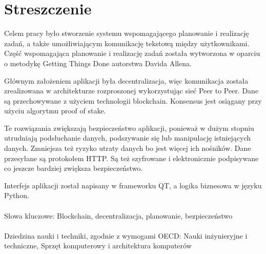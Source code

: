 \chapter*{Streszczenie}
\thispagestyle{plain}

Celem pracy było stworzenie systemu wspomagającego planowanie i realizację zadań, a także umożliwiającym komunikację tekstową między użytkownikami. Część wspomagająca planowanie i realizację zadań została wytworzona w oparciu o metodykę Getting Things Done autorstwa Davida Allena. 

Głównym założeniem aplikacji była decentralizacja, więc komunikacja została zrealizowana w architekturze rozproszonej wykorzystując sieć Peer to Peer. Dane są przechowywane z użyciem technologii blockchain. Konsensus jest osiągany przy użyciu algorytmu proof of stake.

Te rozwiązania zwiększają bezpieczeństwo aplikacji, ponieważ w dużym stopniu utrudniają podsłuchanie danych, podszywanie się lub manipulację istniejących danych. Zmniejsza też ryzyko utraty danych bo jest więcej ich nośników. Dane przesyłane są protokołem HTTP. Są też szyfrowane i elektronicznie podpisywane co jeszcze bardziej zwiększa bezpieczeństwo. 

Interfejs aplikacji został napisany w frameworku QT, a logika biznesowa w języku Python.
\\\\
Słowa kluczowe: Blockchain, decentralizacja, planowanie, bezpieczeństwo
\\\\
Dziedzina nauki i techniki, zgodnie z wymogami OECD: Nauki inżynieryjne i techniczne, Sprzęt komputerowy i architektura komputerów
